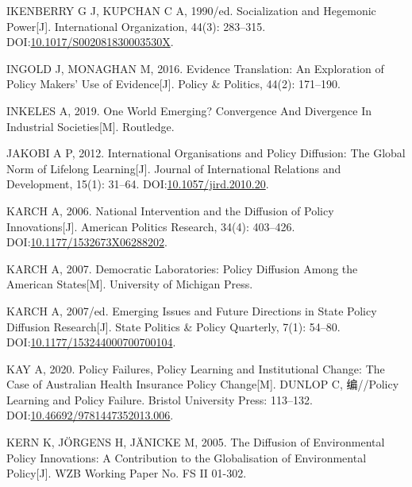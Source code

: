 \documentclass[
  12pt,
]{ctexart}
\newlength{\cslhangindent}
\newlength{\cslentryspacingunit} %
\newenvironment{CSLReferences}[2] %
 {%
  \setlength{\parindent}{0pt}
  \ifodd #1
  \let\oldpar\par
  \def\par{\hangindent=\cslhangindent\oldpar}
  \fi
  \setlength{\parskip}{#2\cslentryspacingunit}
 }%
 {}
\begin{document}
\begin{CSLReferences}{1}{0}
\leavevmode{}%
IKENBERRY G J, KUPCHAN C A, 1990/ed. Socialization and Hegemonic Power{[}J{]}. International Organization, 44(3): 283--315. DOI:\href{https://doi.org/10.1017/S002081830003530X}{10.1017/S002081830003530X}.

\leavevmode{}%
INGOLD J, MONAGHAN M, 2016. Evidence Translation: An Exploration of Policy Makers' Use of Evidence{[}J{]}. Policy \& Politics, 44(2): 171--190.

\leavevmode{}%
INKELES A, 2019. One {World Emerging}? {Convergence And Divergence In Industrial Societies}{[}M{]}. {Routledge}.

\leavevmode{}%
JAKOBI A P, 2012. International Organisations and Policy Diffusion: The Global Norm of Lifelong Learning{[}J{]}. Journal of International Relations and Development, 15(1): 31--64. DOI:\href{https://doi.org/10.1057/jird.2010.20}{10.1057/jird.2010.20}.

\leavevmode{}%
KARCH A, 2006. National {Intervention} and the {Diffusion} of {Policy Innovations}{[}J{]}. American Politics Research, 34(4): 403--426. DOI:\href{https://doi.org/10.1177/1532673X06288202}{10.1177/1532673X06288202}.

\leavevmode{}%
KARCH A, 2007. Democratic {Laboratories}: {Policy Diffusion Among} the {American States}{[}M{]}. {University of Michigan Press}.

\leavevmode{}%
KARCH A, 2007/ed. Emerging {Issues} and {Future Directions} in {State Policy Diffusion Research}{[}J{]}. State Politics \& Policy Quarterly, 7(1): 54--80. DOI:\href{https://doi.org/10.1177/153244000700700104}{10.1177/153244000700700104}.

\leavevmode{}%
KAY A, 2020. Policy {Failures}, {Policy Learning} and {Institutional Change}: {The Case} of {Australian Health Insurance Policy Change}{[}M{]}. DUNLOP C, 编//Policy {Learning} and {Policy Failure}. {Bristol University Press}: 113--132. DOI:\href{https://doi.org/10.46692/9781447352013.006}{10.46692/9781447352013.006}.

\leavevmode{}%
KERN K, JÖRGENS H, JÄNICKE M, 2005. The Diffusion of Environmental Policy Innovations: A Contribution to the Globalisation of Environmental Policy{[}J{]}. {WZB Working Paper No. FS II 01-302}.


\end{CSLReferences}
\end{document}
